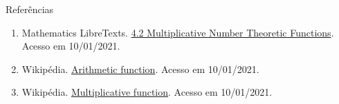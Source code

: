 \begin{frame}[fragile]{Referências}

    \begin{enumerate}

        \item Mathematics LibreTexts. \href{https://math.libretexts.org/Bookshelves/Combinatorics_and_Discrete_Mathematics/Book%3A_Elementary_Number_Theory_(Raji)/04%3A_Multiplicative_Number_Theoretic_Functions/4.02%3A_Multiplicative_Number_Theoretic_Functions#:~:text=The%20number%20of%20divisors%20function%20%CF%84(n)%20is%20multiplicative.,pa22...}{4.2 Multiplicative Number Theoretic Functions}. Acesso em 10/01/2021.

        \item Wikipédia. \href{https://en.wikipedia.org/wiki/Arithmetic_function}{Arithmetic function}. Acesso em 10/01/2021.

        \item Wikipédia. \href{https://en.wikipedia.org/wiki/Multiplicative_function}{Multiplicative function}. Acesso em 10/01/2021.
    \end{enumerate}

\end{frame}
